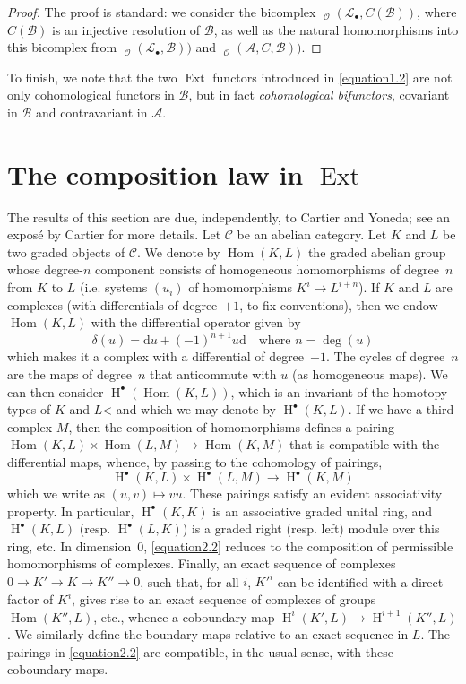 \documentclass{article}
\theoremstyle{plain}
\newcommand{\sh}{\mathscr}
\newcommand{\cat}{\mathcal}
\DeclareMathOperator{\Ext}{Ext}
\DeclareMathOperator{\Hom}{Hom}
\DeclareMathOperator{\shHom}{\underline{Hom}}
\DeclareMathOperator{\HH}{H}
\newcommand{\oldpage}[1]{\marginpar{\footnotesize$\Big\vert$ \textit{p.~#1}}}
\begin{document}
\begin{proof}
  The proof is standard: we consider the bicomplex $\shHom_\sh{O}(\sh{L}_\bullet,C(\sh{B}))$, where $C(\sh{B})$ is an injective resolution of $\sh{B}$, as well as the natural homomorphisms into this bicomplex from $\shHom_\sh{O}(\sh{L}_\bullet,\sh{B}))$ and $\shHom_\sh{O}(\sh{A},C,\sh{B}))$.
\end{proof}

To finish, we note that the two $\Ext$ functors introduced in \cref{equation1.2} are not only cohomological functors in $\sh{B}$, but in fact \emph{cohomological bifunctors}, covariant in $\sh{B}$ and contravariant in $\sh{A}$.


\section{The composition law in $\Ext$}
\label{section2}

The results of this section are due, independently, to Cartier and Yoneda;
see an expos\'{e} by Cartier \cite{1} for more details.
Let $\cat{C}$ be an abelian category.
Let $K$ and $L$ be two graded objects of $\cat{C}$.
We denote by $\Hom(K,L)$ the graded abelian group whose degree-$n$ component consists of homogeneous homomorphisms of degree~$n$ from $K$ to $L$ (i.e. systems $(u_i)$ of homomorphisms $K^i\to L^{i+n}$).
If $K$ and $L$ are complexes (with differentials of degree~$+1$, to fix conventions), then we endow $\Hom(K,L)$ with the differential operator given by
\[
\label{equation2.1}
  \delta(u) = \mathrm{d}u + (-1)^{n+1}u\mathrm{d}
  \quad\text{where }n=\deg(u)
\tag{2.1}
\]
which makes it a complex with a differential of degree~$+1$.
The cycles of degree~$n$ are the maps of degree~$n$ that anticommute with $u$ (as homogeneous maps).
We can then consider $\HH^\bullet(\Hom(K,L))$, which is an invariant of the homotopy types of $K$ and $L$< and which we may denote by $\HH^\bullet(K,L)$.
If we have a third complex $M$, then the composition of homomorphisms defines a pairing $\Hom(K,L)\times\Hom(L,M)\to\Hom(K,M)$ that is compatible with the differential maps, whence, by passing to the cohomology of pairings,
\[
\label{equation2.2}
  \HH^\bullet(K,L)\times\HH^\bullet(L,M) \to \HH^\bullet(K,M)
\tag{2.2}
\]
which we write as $(u,v)\mapsto vu$.
These pairings satisfy an evident associativity property.
In particular, $\HH^\bullet(K,K)$ is an associative graded unital ring, and $\HH^\bullet(K,L)$ (resp. $\HH^\bullet(L,K)$) is a graded right (resp. left) module over this ring, etc.
In dimension~$0$, \cref{equation2.2} reduces to the composition of permissible homomorphisms of complexes.
Finally, an exact sequence of complexes
\oldpage{149-04}
$0\to K'\to K\to K''\to0$, such that, for all $i$, $K'^i$ can be identified with a direct factor of $K^i$, gives rise to an exact sequence of complexes of groups $\Hom(K'',L)$, etc., whence a coboundary map $\HH^i(K',L)\to\HH^{i+1}(K'',L)$.
We similarly define the boundary maps relative to an exact sequence in $L$.
The pairings in \cref{equation2.2} are compatible, in the usual sense, with these coboundary maps.
\end{document}
